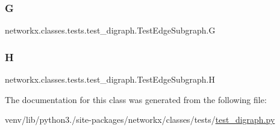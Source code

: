 \subsubsection{\texorpdfstring{G}{G}}
{\footnotesize\ttfamily networkx.\+classes.\+tests.\+test\+\_\+digraph.\+Test\+Edge\+Subgraph.\+G}

\mbox{\label{classnetworkx_1_1classes_1_1tests_1_1test__digraph_1_1TestEdgeSubgraph_a5673ffb4cd38829b90a3ce8434f9d03c}} 
\subsubsection{\texorpdfstring{H}{H}}
{\footnotesize\ttfamily networkx.\+classes.\+tests.\+test\+\_\+digraph.\+Test\+Edge\+Subgraph.\+H}



The documentation for this class was generated from the following file\+:\begin{DoxyCompactItemize}
\item 
venv/lib/python3./site-\/packages/networkx/classes/tests/\hyperlink{test__digraph_8py}{test\+\_\+digraph.\+py}\end{DoxyCompactItemize}

